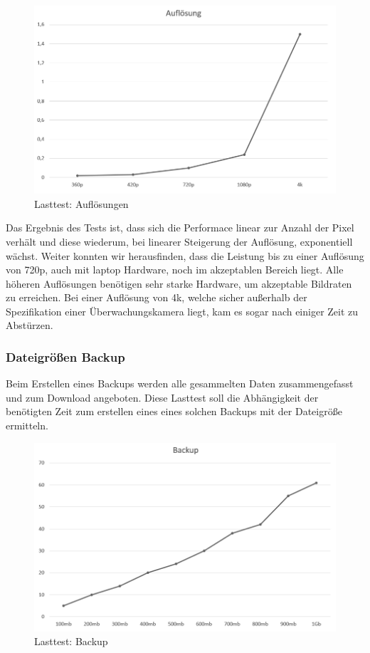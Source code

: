 \begin{figure}[h]
	\centering
	\includegraphics[width=\textwidth]{content/pictures/last_test_aufloesung.png}
	\caption{Lasttest: Auflösungen}
	\label{img:test_resolution}
\end{figure}

Das Ergebnis des Tests ist, dass sich die Performace linear zur Anzahl der Pixel verhält und diese wiederum, bei linearer Steigerung der Auflösung, exponentiell wächst. Weiter konnten wir herausfinden, dass die Leistung bis zu einer Auflösung von 720p, auch mit laptop Hardware, noch im akzeptablen Bereich liegt. Alle höheren Auflösungen benötigen sehr starke Hardware, um akzeptable Bildraten zu erreichen. Bei einer Auflösung von 4k, welche sicher außerhalb der Spezifikation einer Überwachungskamera liegt, kam es sogar nach einiger Zeit zu Abstürzen.

\subsubsection{Dateigrößen Backup}
Beim Erstellen eines Backups werden alle gesammelten Daten zusammengefasst und zum Download angeboten. Diese Lasttest soll die Abhängigkeit der benötigten Zeit zum erstellen eines eines solchen Backups mit der Dateigröße ermitteln.

\begin{figure}[h]
	\centering
	\includegraphics[width=\textwidth]{content/pictures/last_test_backup.png}
	\caption{Lasttest: Backup}
	\label{img:test_files}
\end{figure}

